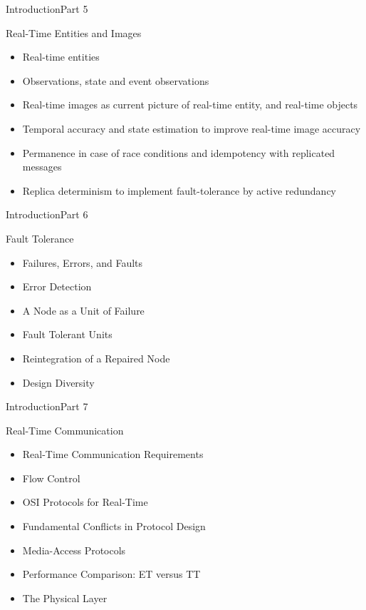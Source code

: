 \begin{frame}{Introduction}{Part 5}
    \begin{block}{Real-Time Entities and Images}
\begin{itemize}
\item
  Real-time entities
\item
  Observations, state and event observations
\item
  Real-time images as current picture of real-time entity, and real-time
  objects
\item
  Temporal accuracy and state estimation to improve real-time image
  accuracy
\item
  Permanence in case of race conditions and idempotency with replicated
  messages
\item
  Replica determinism to implement fault-tolerance by active redundancy
\end{itemize}
\end{block}
\end{frame}


\begin{frame}{Introduction}{Part 6}
    \begin{block}{Fault Tolerance}
\begin{itemize}
\item
  Failures, Errors, and Faults
\item
  Error Detection
\item
  A Node as a Unit of Failure
\item
  Fault Tolerant Units
\item
  Reintegration of a Repaired Node
\item
  Design Diversity
\end{itemize}
\end{block}
\end{frame}


\begin{frame}{Introduction}{Part 7}
    \begin{block}{Real-Time Communication}
\begin{itemize}
\item
  Real-Time Communication Requirements
\item
  Flow Control
\item
  OSI Protocols for Real-Time
\item
  Fundamental Conflicts in Protocol Design
\item
  Media-Access Protocols
\item
  Performance Comparison: ET versus TT
\item
  The Physical Layer
\end{itemize}
\end{block}
\end{frame}


